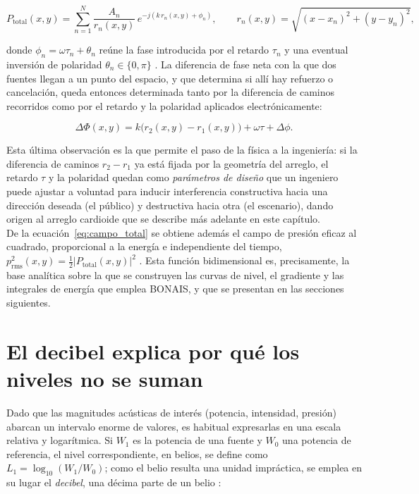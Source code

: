 \begin{equation}
P_{\text{total}}(x,y) = \sum_{n=1}^{N} \frac{A_n}{r_n(x,y)}\,
e^{-j\left(k\,r_n(x,y) + \phi_n\right)},
\qquad
r_n(x,y) = \sqrt{(x-x_n)^2+(y-y_n)^2},
\label{eq:campo_total}
\end{equation}

donde \(\phi_n=\omega\tau_n+\theta_n\) reúne la fase introducida por el
retardo \(\tau_n\) y una eventual inversión de polaridad
\(\theta_n\in\{0,\pi\}\) \cite{pierce2014handbook}. La diferencia de fase
neta con la que dos fuentes llegan a un punto del espacio, y que
determina si allí hay refuerzo o cancelación, queda entonces
determinada tanto por la diferencia de caminos recorridos como por el
retardo y la polaridad aplicados electrónicamente:

\begin{equation}
\Delta\Phi(x,y) = k\big(r_2(x,y)-r_1(x,y)\big) + \omega\tau + \Delta\phi.
\label{eq:fase_neta}
\end{equation}

Esta última observación es la que permite el paso de la física a la
ingeniería: si la diferencia de caminos \(r_2-r_1\) ya está fijada por
la geometría del arreglo, el retardo \(\tau\) y la polaridad quedan como
\emph{parámetros de diseño} que un ingeniero puede ajustar a voluntad
para inducir interferencia constructiva hacia una dirección deseada
(el público) y destructiva hacia otra (el escenario), dando origen al
arreglo cardioide que se describe más adelante en este capítulo.\\

De la ecuación~\eqref{eq:campo_total} se obtiene además el campo de
presión eficaz al cuadrado, proporcional a la energía e independiente
del tiempo, \(p_{\text{rms}}^2(x,y)=\tfrac{1}{2}|P_{\text{total}}(x,y)|^2\)
\cite{pierce2014handbook}. Esta función bidimensional es, precisamente,
la base analítica sobre la que se construyen las curvas de nivel, el
gradiente y las integrales de energía que emplea BONAIS, y que se
presentan en las secciones siguientes.

\section{El decibel explica por qué los niveles no se suman}
\label{sec:decibel}

Dado que las magnitudes acústicas de interés (potencia, intensidad,
presión) abarcan un intervalo enorme de valores, es habitual
expresarlas en una escala relativa y logarítmica. Si \(W_1\) es la
potencia de una fuente y \(W_0\) una potencia de referencia, el nivel
correspondiente, en belios, se define como
\(L_1=\log_{10}(W_1/W_0)\); como el belio resulta una unidad
impráctica, se emplea en su lugar el \emph{decibel}, una décima parte
de un belio \cite[pág.~27]{everest2001}:

